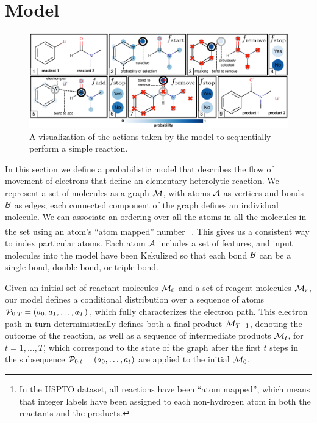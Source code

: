 
\section{Model}



\begin{figure}
\centering
\includegraphics[width=\textwidth]{reaction_model_blue}
\caption{A visualization of the actions taken by the model to sequentially perform a simple reaction.}
\label{fig:reaction_model}
\end{figure}



In this section we define a probabilistic model that describes the flow of movement of electrons that define an elementary heterolytic reaction.
We represent a set of molecules as a graph ${\mathcal{M}}$, with atoms ${\mathcal{A}}$ as vertices and bonds ${\mathcal{B}}$ as edges;
each connected component of the graph defines an individual molecule.
We can associate an ordering over all the atoms in all the molecules in the set using an atom's ``atom mapped'' number \footnote{In the USPTO dataset, all reactions have been ``atom mapped'', which means that integer labels have been assigned to each non-hydrogen atom in both the reactants and the products.}. This gives us a consistent way to index particular atoms.
Each atom ${\mathcal{A}}$ includes a set of features,
and input molecules into the model have been Kekulized  so that each bond ${\mathcal{B}}$ can be a single bond, double bond, or triple bond.




Given an initial set of reactant molecules ${\mathcal{M}}_0$ and a set of reagent molecules ${\mathcal{M}}_r$, 
our model defines a conditional distribution over a sequence of atoms ${\mathcal{P}}_{0:T} = (a_0, a_1, \ldots, a_T)$,
which fully characterizes the electron path.
This electron path in turn deterministically defines both a final product ${\mathcal{M}}_{T+1}$, 
denoting the outcome of the reaction,
as well as a sequence of intermediate products ${\mathcal{M}}_t$, for $t = 1,\dots,T$,
which correspond to the state of the graph after the first $t$ steps in the subsequence ${\mathcal{P}}_{0:t} = (a_0, \dots, a_t)$ are applied to the initial ${\mathcal{M}}_0$.


